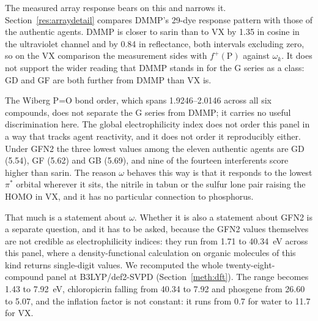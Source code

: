 \documentclass[journal=jacsat,manuscript=suppinfo,margin=1in]{achemso}
\begin{document}
The measured array response bears on this and narrows it.
Section~\ref{res:arraydetail} compares DMMP's 29-dye response pattern with those of
the authentic agents. DMMP is closer to sarin than to VX by 1.35 in cosine in
the ultraviolet channel and by 0.84 in reflectance, both intervals excluding
zero, so on the VX comparison the measurement sides with $f^{+}(\mathrm{P})$
against $\omega_k$. It does not support the wider reading that DMMP stands in
for the G series as a class: GD and GF are both further from DMMP than VX is.

\begin{table}[!htb]
\centering
\caption{GFN2-xTB local reactivity at phosphorus for the six phosphorus-bearing
compounds. $f^{+}(\mathrm{P})$ is the condensed Fukui index for nucleophilic
attack at phosphorus, in the frontier-electron formulation of Parr and
Yang\cite{parryang1984} with the atomic condensation of Yang and
Mortier.\cite{yangmortier1986} $\omega$ is the global electrophilicity index in the
definition of Parr et al.~\cite{parr1999} with $\eta$ equal to half the
HOMO--LUMO gap, and $\omega_k = \omega f^{+}(\mathrm{P})$ is the composite local
electrophilicity of Domingo et al.~\cite{domingo2016}. The two reactivity
conventions disagree about VX and the text says why.}
\label{tab:plocal}
\small

\end{table}

The Wiberg P=O bond order,\cite{wiberg1968,mayer1983} which spans
1.9246--2.0146 across all six compounds, does
not separate the G series from DMMP; it carries no useful discrimination here.
The global electrophilicity index does not order this panel in a way that
tracks agent reactivity, and it does not order it reproducibly either. Under
GFN2 the three lowest values among the eleven authentic agents are GD (5.54),
GF (5.62) and GB (5.69), and nine of the fourteen interferents score higher
than sarin. The reason $\omega$ behaves this way is that it responds to the
lowest $\pi^{*}$ orbital wherever it sits, the nitrile in tabun or the sulfur
lone pair raising the HOMO in VX, and it has no particular connection to
phosphorus.

That much is a statement about $\omega$. Whether it is also a statement about
GFN2 is a separate question, and it has to be asked, because the GFN2 values
themselves are not credible as electrophilicity indices: they run from 1.71 to
40.34~eV across this panel, where a density-functional calculation on organic
molecules of this kind returns single-digit values. We recomputed the whole
twenty-eight-compound panel at B3LYP/def2-SVPD (Section~\ref{meth:dft}). The
range becomes 1.43 to 7.92~eV, chloropicrin falling from 40.34 to 7.92 and
phosgene from 26.60 to 5.07, and the inflation factor is not constant: it runs
from 0.7 for water to 11.7 for VX.
\end{document}
